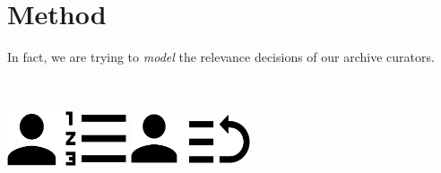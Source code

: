 \documentclass[xcolor={svgnames}]{beamer}
\makeatletter
\newcommand*{\currentname}{\@currentlabelname}
\makeatother
\begin{document}
\section{Method}

\begin{frame}{\currentname}\linespread{1.5}
  In fact, we are trying to \textit{model} the relevance decisions of our archive curators.

  \centering
  \includegraphics[width=100pt,height=100pt,keepaspectratio]{img/relevance_decision.eps}
  \includegraphics[width=100pt,height=100pt,keepaspectratio]{img/prioritization.eps}
\end{frame}
\end{document}
